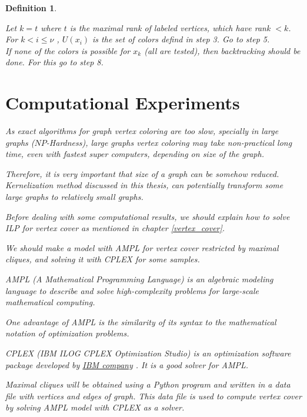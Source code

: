 \documentclass[12pt]{article}
\theoremstyle{slplain}
\newtheorem{defi}{Definition}[section]
\begin{document}
\begin{defi}
\begin{algorithm}[H]
{\nl Let $k = t$ where $t$ is the maximal rank of labeled vertices, which have rank $< k$. For $k < i \leq \nu$ , $U(x_i)$ is the set of colors defind in step 3. Go to step 5.\\


\nl If none of the colors is possible for $x_k$ (all are tested), then backtracking
should be done. For this go to step 8.\\}
\end{algorithm}
\restoregeometry

\newpage


\section{Computational Experiments}\label{exp}

As exact algorithms for graph vertex coloring are too slow, specially in large 
graphs ($NP$-Hardness), large graphs vertex coloring 
may take non-practical long time, even with fastest super computers, depending on size of the graph. 

Therefore, it is very important that size of a graph can be somehow reduced. 
Kernelization method discussed in this thesis, can potentially transform some large graphs to relatively small
graphs. 

Before dealing with some computational results, we should explain how to solve ILP for vertex cover as mentioned in chapter \ref{vertex_cover}.

We should make a model with AMPL\cite{ampl} for vertex cover restricted by
maximal cliques, and solving it with CPLEX\cite{cplex} for some samples.

AMPL (A Mathematical Programming Language) is an algebraic modeling language to describe and solve high-complexity problems for large-scale mathematical computing. 

One advantage of AMPL is the similarity of its syntax to the mathematical notation of optimization problems.

CPLEX (IBM ILOG CPLEX Optimization Studio) is an optimization software package developed by \href{https://www.ibm.com/us-en/}{IBM company} \cite{IBM}. It is a good solver for AMPL.

Maximal cliques will be obtained using a Python program and written in a data file 
with vertices and edges of graph. This data file is used to compute vertex cover by solving AMPL model with CPLEX as a solver.




\end{defi}
\end{document}
